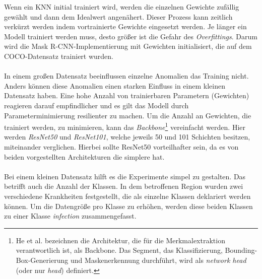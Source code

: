 Wenn ein KNN initial trainiert wird, werden die einzelnen Gewichte zufällig gewählt und dann dem Idealwert angenähert. Dieser Prozess kann zeitlich verkürzt werden indem vortrainierte Gewichte eingesetzt werden. Je länger ein Modell trainiert werden muss, desto größer ist die Gefahr des \textit{Overfittings}. Darum wird die Mask R-CNN-Implementierung mit Gewichten initialisiert, die auf dem COCO-Datensatz trainiert wurden.
\\\\
In einem großen Datensatz beeinflussen einzelne Anomalien das Training nicht. Anders können diese Anomalien einen starken Einfluss in einem kleinen Datensatz haben. Eine hohe Anzahl von trainierbaren Parametern (Gewichten) reagieren darauf empfindlicher und es gilt das Modell durch Parameterminimierung resilienter zu machen. Um die Anzahl an Gewichten, die trainiert werden, zu minimieren, kann das \textit{Backbone}\footnote{He et al. bezeichnen die Architektur, die für die Merkmalextraktion verantwortlich ist, als Backbone. Das Segment, das Klassifizierung, Bounding-Box-Generierung und Maskenerkennung durchführt, wird als \textit{network head} (oder nur \textit{head}) definiert.\cite{ref:maskrcnn}} vereinfacht werden. Hier werden \textit{ResNet50} und \textit{ResNet101}, welche jeweils 50 und 101 Schichten besitzen, miteinander verglichen. Hierbei sollte ResNet50 vorteilhafter sein, da es von beiden vorgestellten Architekturen die simplere hat.
\\\\
Bei einem kleinen Datensatz hilft es die Experimente simpel zu gestalten. Das betrifft auch die Anzahl der Klassen. In dem betroffenen Region wurden zwei verschiedene Krankheiten festgestellt, die als einzelne Klassen deklariert werden können. Um die Datengröße pro Klasse zu erhöhen, werden diese beiden Klassen zu einer Klasse \textit{infection} zusammengefasst. 